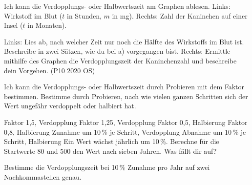 \begin{aufgabe}{Ich kann die Verdopplungs- oder Halbwertszeit am Graphen ablesen.}
Links: Wirkstoff im Blut ($t$ in Stunden, $m$ in mg). Rechts: Zahl der Kaninchen auf einer Insel ($t$ in Monaten).

\begin{ksys}[xmin=0,xmax=8,ymin=0,ymax=400,ystep=50,ablesen,xlabel=$t$,ylabel=$m$]
\end{ksys}\ksysabstand\begin{ksys}[xmin=0,xmax=10,ymin=0,ymax=180,ystep=20,ablesen,xlabel=$t$,ylabel=$N$]
\end{ksys}

\begin{teile}
\teil Links: Lies ab, nach welcher Zeit nur noch die Hälfte des Wirkstoffs im Blut ist. 
\teil Beschreibe in zwei Sätzen, wie du bei a) vorgegangen bist.
\teil Rechts: Ermittle mithilfe des Graphen die Verdopplungszeit der Kaninchenzahl und beschreibe dein Vorgehen. (P10 2020 OS)
\end{teile}
\end{aufgabe}

\begin{aufgabe}{Ich kann die Verdopplungs- oder Halbwertszeit durch Probieren mit dem Faktor bestimmen.}
Bestimme durch Probieren, nach wie vielen ganzen Schritten sich der Wert ungefähr verdoppelt oder halbiert hat.
\begin{teile}
\teil Faktor 1,5, Verdopplung \quad \leerfeld
\teil Faktor 1,25, Verdopplung \quad \leerfeld
\teil Faktor 0,5, Halbierung \quad \leerfeld
\teil Faktor 0,8, Halbierung \quad \leerfeld
\teil Zunahme um 10\,\% je Schritt, Verdopplung \quad \leerfeld
\teil Abnahme um 10\,\% je Schritt, Halbierung \quad \leerfeld
{}
\teil Ein Wert wächst jährlich um 10\,\%. Berechne für die Startwerte 80 und 500 den Wert nach sieben Jahren. Was fällt dir auf?
\end{teile}
\begin{teile}
\teil Bestimme die Verdopplungszeit bei 10\,\% Zunahme pro Jahr auf zwei Nachkommastellen genau. 
\end{teile}
\end{aufgabe}

